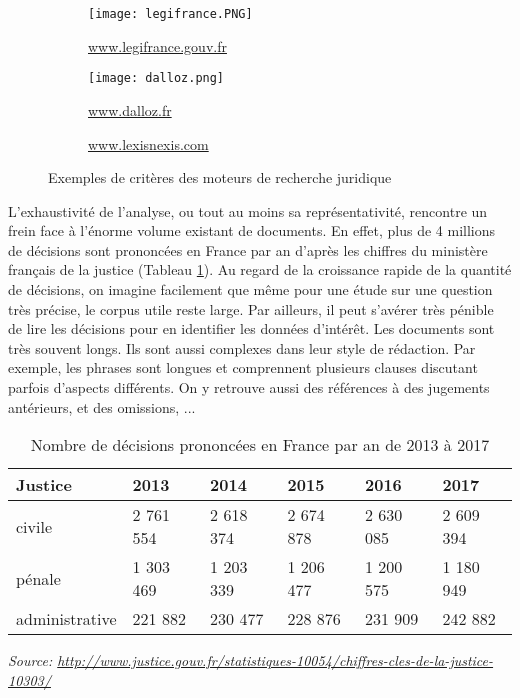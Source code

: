 \begin{figure}
	\centering
	\begin{subfigure}[t]{0.95\textwidth}
		\centering
		\texttt{[image: legifrance.PNG]}
		\caption{\url{www.legifrance.gouv.fr}}
	\end{subfigure}%

	\begin{subfigure}[t]{0.45\textwidth}
		\centering
		\texttt{[image: dalloz.png]}
		\caption{\url{www.dalloz.fr}}
	\end{subfigure}\hfill
	\begin{subfigure}[t]{0.55\textwidth}
		\centering
		\caption{\url{www.lexisnexis.com}}
	\end{subfigure}%
	\caption{Exemples de critères des moteurs de recherche juridique}\label{fig:intro:juriSearchForm}
\end{figure}

L'exhaustivité de l'analyse, ou tout au moins sa représentativité, rencontre un frein face à l'énorme volume existant de documents. En effet, plus de 4 millions de décisions sont prononcées en France par an d'après les chiffres du ministère français de la justice (Tableau \ref{tab:intro:nbdecisionstats}). Au regard de la croissance rapide de la quantité de décisions, on imagine facilement que même pour une étude sur une question très précise, le corpus utile reste large. Par ailleurs, il peut s'avérer très pénible de lire les décisions pour en identifier les données d'intérêt. Les documents sont très souvent longs. Ils sont aussi complexes dans leur style de rédaction. Par exemple, les phrases sont longues et comprennent plusieurs clauses discutant parfois d'aspects différents. On y retrouve aussi des références à des jugements antérieurs, et des omissions, ...
\begin{table}
\small
\begin{center}
\begin{tabular}{|l|l|l|l|l|l|}
	\hline
\textbf{Justice}	& \textbf{2013}      & \textbf{2014}      & \textbf{2015}      & \textbf{2016}      & \textbf{2017}      \\ \hline
	civile         & 2 761 554 & 2 618 374 & 2 674 878 & 2 630 085 & 2 609 394 \\ \hline
	pénale         & 1 303 469 & 1 203 339 & 1 206 477 & 1 200 575 & 1 180 949 \\ \hline
	administrative & 221 882   & 230 477   & 228 876   & 231 909   & 242 882   \\ \hline
\end{tabular}

\textit{\scriptsize{Source: \url{http://www.justice.gouv.fr/statistiques-10054/chiffres-cles-de-la-justice-10303/}}}  
\end{center}
\caption{Nombre de décisions prononcées en France par an de 2013 à 2017}\label{tab:intro:nbdecisionstats}
\end{table}



